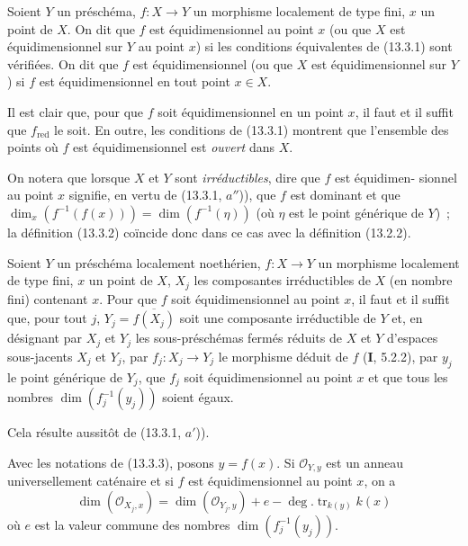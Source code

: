 \begin{definition}[13.3.2]
\label{IV.13.3.2-fr}
Soient $Y$ un préschéma, $f:X\to Y$ un morphisme localement de type fini, $x$
un point de $X$. On dit que $f$ est équidimensionnel au point $x$ (ou que $X$
est équidimensionnel sur $Y$ au point $x$) si les conditions équivalentes de
(13.3.1) sont vérifiées. On dit que $f$ est équidimensionnel (ou que $X$ est
équidimensionnel sur $Y$) si $f$ est équidimensionnel en tout point $x\in X$.
\end{definition}

Il est clair que, pour que $f$ soit équidimensionnel en un point $x$, il faut
et il suffit que $f_{\mathrm{red}}$ le soit. En outre, les conditions de
(13.3.1) montrent que l'ensemble des points où $f$ est équidimensionnel est
\emph{ouvert} dans $X$.

On notera que lorsque $X$ et $Y$ sont \emph{irréductibles}, dire que $f$ est
équidimen-
sionnel au point $x$ signifie, en vertu de (13.3.1, $a''$)), que $f$ est
dominant et que
$\dim_x(f^{-1}(f(x)))=\dim(f^{-1}(\eta))$ (où $\eta$ est le point générique de
$Y$)~; la définition (13.3.2) coïncide donc dans ce cas avec la définition
(13.2.2).

\begin{proposition}[13.3.3]
\label{IV.13.3.3-fr}
Soient $Y$ un préschéma localement noethérien, $f:X\to Y$ un morphisme
localement de type fini, $x$ un point de $X$, $X_j$ les composantes
irréductibles de $X$ (en nombre fini) contenant $x$. Pour que $f$ soit
équidimensionnel au point $x$, il faut et il suffit que, pour tout $j$,
$Y_j=\overline{f(X_j)}$ soit une composante irréductible de $Y$ et, en
désignant par $X_j$ et $Y_j$ les sous-préschémas fermés réduits de $X$ et $Y$
d'espaces sous-jacents $X_j$ et $Y_j$, par $f_j:X_j\to Y_j$ le morphisme
déduit de $f$ (\textbf{I}, 5.2.2), par $y_j$ le point générique de $Y_j$, que
$f_j$ soit équidimensionnel au point $x$ et que tous les nombres
$\dim(f_j^{-1}(y_j))$ soient égaux.
\end{proposition}

Cela résulte aussitôt de (13.3.1, $a'$)).

\begin{corollary}[13.3.4]
\label{IV.13.3.4-fr}
Avec les notations de (13.3.3), posons $y=f(x)$. Si $\mathcal O_{Y,y}$ est un
anneau universellement caténaire et si $f$ est équidimensionnel au point $x$,
on a
\[
\tag{13.3.4.1}
\label{IV.13.3.4.1-fr}
  \dim(\mathcal O_{X_j,x})=\dim(\mathcal O_{Y_j,y})+e
  -\deg.\operatorname{tr}_{k(y)}k(x)
\]
où $e$ est la valeur commune des nombres $\dim(f_j^{-1}(y_j))$.
\end{corollary}

